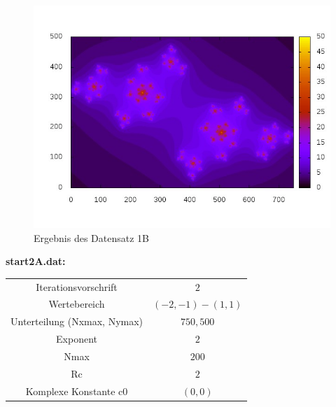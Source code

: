 \documentclass{report}
\begin{document}
\begin{figure}[h]
    \includegraphics[scale=0.7]{ergebnis1B}
    \caption{Ergebnis des Datensatz 1B}
    \label{fig:ergebnis1B} %
\end{figure}


\clearpage{}
\textbf{start2A.dat:}

\begin{center}
\begin{tabular}{c|c}
Iterationsvorschrift & $2$ \\
\cline{1-2}
Wertebereich & $(-2, -1) - (1, 1)$ \\
\cline{1-2}
Unterteilung (Nxmax, Nymax) & $750, 500$ \\
\cline{1-2}
Exponent & $2$  \\
\cline{1-2}
Nmax & $200$ \\
\cline{1-2}
Rc & $2$ \\
\cline{1-2}
Komplexe Konstante c0 & $(0, 0)$ \\
\cline{1-2}
\end{tabular}
\label{tab:resA2_3}
\end{center}
\end{document}
